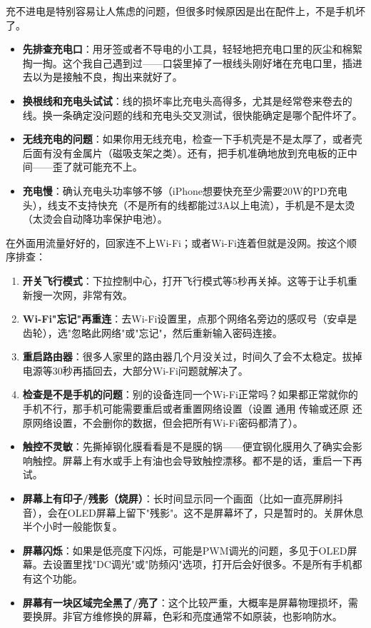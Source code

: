 
充不进电是特别容易让人焦虑的问题，但很多时候原因是出在配件上，不是手机坏了。

\begin{itemize}
  \item \textbf{先排查充电口}：用牙签或者不导电的小工具，轻轻地把充电口里的灰尘和棉絮掏一掏。这个我自己遇到过——口袋里掉了一根线头刚好堵在充电口里，插进去以为是接触不良，掏出来就好了。
  \item \textbf{换根线和充电头试试}：线的损坏率比充电头高得多，尤其是经常卷来卷去的线。换一条确定没问题的线和充电头交叉测试，很快能确定是哪个配件坏了。
  \item \textbf{无线充电的问题}：如果你用无线充电，检查一下手机壳是不是太厚了，或者壳后面有没有金属片（磁吸支架之类）。还有，把手机准确地放到充电板的正中间——歪了就可能充不上。
  \item \textbf{充电慢}：确认充电头功率够不够（iPhone想要快充至少需要20W的PD充电头），线支不支持快充（不是所有的线都能过3A以上电流），手机是不是太烫（太烫会自动降功率保护电池）。
\end{itemize}


在外面用流量好好的，回家连不上Wi-Fi；或者Wi-Fi连着但就是没网。按这个顺序排查：

\begin{enumerate}
  \item \textbf{开关飞行模式}：下拉控制中心，打开飞行模式等5秒再关掉。这等于让手机重新搜一次网，非常有效。
  \item \textbf{Wi-Fi"忘记"再重连}：去Wi-Fi设置里，点那个网络名旁边的感叹号（安卓是齿轮），选"忽略此网络"或"忘记"，然后重新输入密码连接。
  \item \textbf{重启路由器}：很多人家里的路由器几个月没关过，时间久了会不太稳定。拔掉电源等30秒再插回去，大部分Wi-Fi问题就解决了。
  \item \textbf{检查是不是手机的问题}：别的设备连同一个Wi-Fi正常吗？如果都正常就你的手机不行，那手机可能需要重启或者重置网络设置（设置 通用 传输或还原 还原网络设置，不会删你的数据，但会把所有Wi-Fi密码都清了）。
\end{enumerate}


\begin{itemize}
  \item \textbf{触控不灵敏}：先撕掉钢化膜看看是不是膜的锅——便宜钢化膜用久了确实会影响触控。屏幕上有水或手上有油也会导致触控漂移。都不是的话，重启一下再试。
  \item \textbf{屏幕上有印子/残影（烧屏）}：长时间显示同一个画面（比如一直亮屏刷抖音），会在OLED屏幕上留下"残影"。这不是屏幕坏了，只是暂时的。关屏休息半个小时一般能恢复。
  \item \textbf{屏幕闪烁}：如果是低亮度下闪烁，可能是PWM调光的问题，多见于OLED屏幕。去设置里找"DC调光"或"防频闪"选项，打开后会好很多。不是所有手机都有这个功能。
  \item \textbf{屏幕有一块区域完全黑了/亮了}：这个比较严重，大概率是屏幕物理损坏，需要换屏。非官方维修换的屏幕，色彩和亮度通常不如原装，也影响防水。
\end{itemize}

